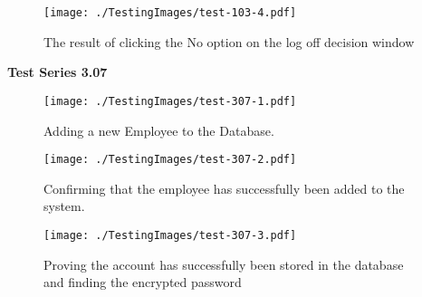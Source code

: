 \begin{figure}[H]
    \texttt{[image: ./TestingImages/test-103-4.pdf]}
    \caption{The result of clicking the No option on the log off decision window} \label{fig:test-103-4}
\end{figure}

\textbf{Test Series 3.07}

\begin{figure}[H]
    \texttt{[image: ./TestingImages/test-307-1.pdf]}
    \caption{Adding a new Employee to the Database.} \label{fig:test-307-1}
\end{figure}

\begin{figure}[H]
    \texttt{[image: ./TestingImages/test-307-2.pdf]}
    \caption{Confirming that the employee has successfully been added to the system.} \label{fig:test-307-2}
\end{figure}

\begin{figure}[H]
    \texttt{[image: ./TestingImages/test-307-3.pdf]}
    \caption{Proving the account has successfully been stored in the database and finding the encrypted password} \label{fig:test-307-3}
\end{figure}

